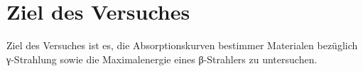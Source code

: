 \section{Ziel des Versuches}

Ziel des Versuches ist es, die Absorptionskurven bestimmer Materialen bezüglich γ-Strahlung sowie die Maximalenergie
eines β-Strahlers zu untersuchen. 
